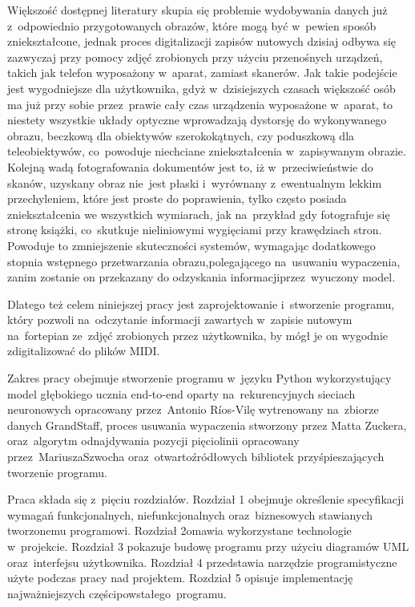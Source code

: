 \documentclass[xodstep]{wnspt}
\begin{document}
Większość dostępnej literatury skupia się problemie wydobywania danych już z~odpowiednio przygotowanych obrazów, które mogą być w~pewien sposób zniekształcone, jednak proces digitalizacji zapisów nutowych dzisiaj odbywa się zazwyczaj przy pomocy zdjęć zrobionych przy użyciu przenośnych urządzeń, takich jak telefon wyposażony w~aparat, zamiast skanerów. Jak takie podejście jest wygodniejsze dla użytkownika, gdyż w~dzisiejszych czasach większość osób ma już przy sobie przez~prawie cały czas urządzenia wyposażone w~aparat, to niestety wszystkie układy optyczne wprowadzają dystorsję do wykonywanego obrazu, beczkową dla obiektywów szerokokątnych, czy poduszkową dla teleobiektywów, co~powoduje niechciane zniekształcenia w~zapisywanym obrazie. Kolejną wadą fotografowania dokumentów jest to, iż w~przeciwieństwie do skanów, uzyskany obraz nie~jest płaski i~wyrównany z~ewentualnym lekkim przechyleniem, które jest proste do poprawienia, tylko często posiada zniekształcenia we wszystkich wymiarach, jak na~przykład gdy fotografuje się stronę książki, co~skutkuje nieliniowymi wygięciami przy krawędziach stron. Powoduje to zmniejszenie skuteczności systemów, wymagając dodatkowego stopnia wstępnego przetwarzania obrazu,\linebreak polegającego na~usuwaniu wypaczenia, zanim zostanie on przekazany do odzyskania informacji\linebreak przez~wyuczony model.

Dlatego też celem niniejszej pracy jest zaprojektowanie i~stworzenie programu, który pozwoli na~odczytanie informacji zawartych w~zapisie nutowym na~fortepian ze~zdjęć zrobionych przez użytkownika, by mógł je on wygodnie zdigitalizować do plików MIDI. 

Zakres pracy obejmuje stworzenie programu w~języku Python wykorzystujący model głębokiego ucznia end-to-end oparty na~rekurencyjnych sieciach neuronowych opracowany przez~Antonio Ríos-Vilę wytrenowany na~zbiorze danych GrandStaff\cite{Rios-Vila2023}, proces usuwania wypaczenia stworzony przez Matta Zuckera\cite{Zucker2016}, oraz~algorytm odnajdywania pozycji pięciolinii opracowany przez~Mariusza\linebreak Szwocha\cite{Szwoch2005} oraz~otwartoźródłowych bibliotek przyśpieszających tworzenie programu.

Praca składa się z~pięciu rozdziałów. Rozdział 1 obejmuje określenie specyfikacji wymagań funkcjonalnych, niefunkcjonalnych oraz~biznesowych stawianych tworzonemu programowi. Rozdział 2\linebreak omawia wykorzystane technologie w~projekcie. Rozdział 3 pokazuje budowę programu przy użyciu diagramów UML oraz~interfejsu użytkownika. Rozdział 4 przedstawia narzędzie programistyczne użyte podczas pracy nad projektem. Rozdział 5 opisuje implementację najważniejszych części\linebreak powstałego~programu.
\end{document}
